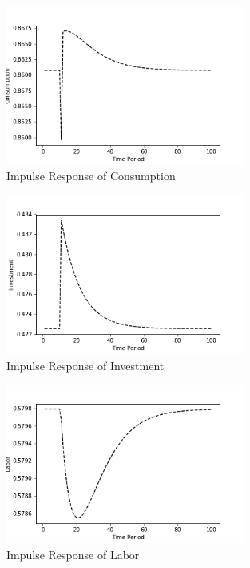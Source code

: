 \documentclass[letterpaper,11pt]{article}
\theoremstyle{definition}
\begin{document}
\begin{spacing}{1.5}
\begin{Exercise}
		\begin{figure}[H]
			\caption{Impulse Response of Consumption}
			\label{fig:consumption_impulse}
			\includegraphics[width=0.7\textwidth]{Consumptionimpulse.png}
		\end{figure}

		\begin{figure}[H]
			\caption{Impulse Response of Investment}
			\label{fig:investment_impulse}
			\includegraphics[width=0.7\textwidth]{Investmentimpulse.png}
		\end{figure}

		\begin{figure}[H]
			\caption{Impulse Response of Labor}
			\label{fig:labor_impulse}
			\includegraphics[width=0.7\textwidth]{Laborimpulse.png}
		\end{figure}
	\end{Exercise}


\end{spacing}
\end{document}
